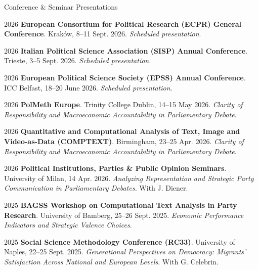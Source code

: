 \documentclass{cv}
\begin{document}
\begin{rSection}{Conference \& Seminar Presentations}

\begin{presentationEntry}{2026}
{\textbf{European Consortium for Political Research (ECPR) General Conference}. Kraków, 8--11 Sept. 2026. \textit{Scheduled presentation}.}
\end{presentationEntry}

\begin{presentationEntry}{2026}
{\textbf{Italian Political Science Association (SISP) Annual Conference}. Trieste, 3--5 Sept. 2026. \textit{Scheduled presentation}.}
\end{presentationEntry}

\begin{presentationEntry}{2026}
{\textbf{European Political Science Society (EPSS) Annual Conference}. ICC Belfast, 18--20 June 2026. \textit{Scheduled presentation}.}
\end{presentationEntry}

\begin{presentationEntry}{2026}
{\textbf{PolMeth Europe}. Trinity College Dublin, 14--15 May 2026. \textit{Clarity of Responsibility and Macroeconomic Accountability in Parliamentary Debate}.}
\end{presentationEntry}

\begin{presentationEntry}{2026}
{\textbf{Quantitative and Computational Analysis of Text, Image and Video-as-Data (COMPTEXT)}. Birmingham, 23--25 Apr. 2026. \textit{Clarity of Responsibility and Macroeconomic Accountability in Parliamentary Debate}.}
\end{presentationEntry}

\begin{presentationEntry}{2026}
{\textbf{Political Institutions, Parties \& Public Opinion Seminars}. University of Milan, 14 Apr. 2026. \textit{Analyzing Representation and Strategic Party Communication in Parliamentary Debates.} With J. Diener.}
\end{presentationEntry}

\begin{presentationEntry}{2025}
{\textbf{BAGSS Workshop on Computational Text Analysis in Party Research}. University of Bamberg, 25--26 Sept. 2025. \textit{Economic Performance Indicators and Strategic Valence Choices}.}
\end{presentationEntry}

\begin{presentationEntry}{2025}
{\textbf{Social Science Methodology Conference (RC33)}. University of Naples, 22--25 Sept. 2025. \textit{Generational Perspectives on Democracy: Migrants' Satisfaction Across National and European Levels}. With G. Celebrin.}
\end{presentationEntry}


\end{rSection}
\end{document}
